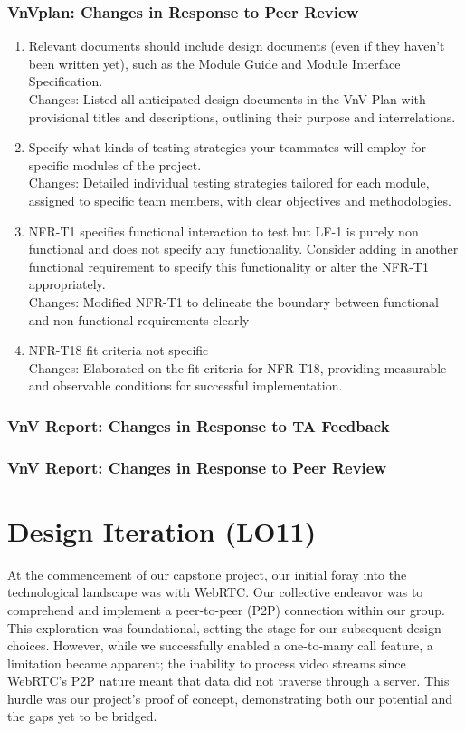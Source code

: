 \documentclass{article}
\begin{document}
\subsubsection{VnVplan: Changes in Response to Peer Review}
\begin{enumerate}
        \item Relevant documents should include design documents (even if they 
        haven't been written yet), such as the Module Guide and Module Interface 
        Specification.\\
        Changes: Listed all anticipated design documents in the VnV Plan with provisional titles and descriptions, outlining their purpose and interrelations.
        \item Specify what kinds of testing strategies your teammates will employ 
        for specific modules of the project.\\
        Changes: Detailed individual testing strategies tailored for each module, assigned to specific team members, with clear objectives and methodologies.
        \item NFR-T1 specifies functional interaction to test but LF-1 is purely 
        non functional and does not specify any functionality. Consider adding 
        in another functional requirement to specify this functionality or alter 
        the NFR-T1 appropriately.\\
        Changes: Modified NFR-T1 to delineate the boundary between functional and non-functional requirements clearly
        \item NFR-T18 fit criteria not specific\\
        Changes: Elaborated on the fit criteria for NFR-T18, providing measurable and observable conditions for successful implementation.
\end{enumerate} 
\subsubsection{VnV Report: Changes in Response to TA Feedback}

\subsubsection{VnV Report: Changes in Response to Peer Review}


\section{Design Iteration (LO11)}
At the commencement of our capstone project, our initial foray into the technological landscape was with WebRTC. 
Our collective endeavor was to comprehend and implement a peer-to-peer (P2P) connection within our group. 
This exploration was foundational, setting the stage for our subsequent design choices. 
However, while we successfully enabled a one-to-many call feature, a limitation became apparent; the inability to process video streams since WebRTC's P2P nature meant that data did not traverse through a server. 
This hurdle was our project's proof of concept, demonstrating both our potential and the gaps yet to be bridged.
\end{document}
